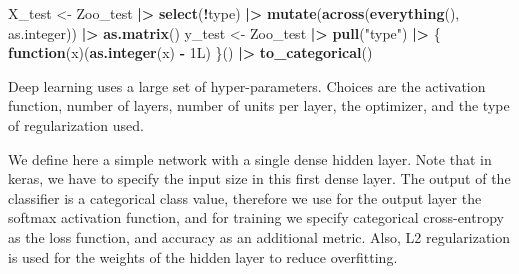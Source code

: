 \documentclass[
  notitlepage]{book}
\newenvironment{Shaded}{\begin{snugshade}}{\end{snugshade}}
\newcommand{\ControlFlowTok}[1]{\textcolor[rgb]{0.13,0.29,0.53}{\textbf{#1}}}
\newcommand{\ErrorTok}[1]{\textcolor[rgb]{0.64,0.00,0.00}{\textbf{#1}}}
\newcommand{\KeywordTok}[1]{\textcolor[rgb]{0.13,0.29,0.53}{\textbf{#1}}}
\newcommand{\NormalTok}[1]{#1}
\newcommand{\OperatorTok}[1]{\textcolor[rgb]{0.81,0.36,0.00}{\textbf{#1}}}
\newcommand{\StringTok}[1]{\textcolor[rgb]{0.31,0.60,0.02}{#1}}
\begin{document}
\begin{Shaded}
\begin{Highlighting}[]
\NormalTok{X\_test \textless{}{-}}\StringTok{ }\NormalTok{Zoo\_test }\OperatorTok{|}\ErrorTok{\textgreater{}}\StringTok{ }
\StringTok{  }\KeywordTok{select}\NormalTok{(}\OperatorTok{!}\NormalTok{type) }\OperatorTok{|}\ErrorTok{\textgreater{}}\StringTok{ }
\StringTok{  }\KeywordTok{mutate}\NormalTok{(}\KeywordTok{across}\NormalTok{(}\KeywordTok{everything}\NormalTok{(), as.integer)) }\OperatorTok{|}\ErrorTok{\textgreater{}}\StringTok{ }
\StringTok{  }\KeywordTok{as.matrix}\NormalTok{()}
\NormalTok{y\_test \textless{}{-}}\StringTok{ }\NormalTok{Zoo\_test }\OperatorTok{|}\ErrorTok{\textgreater{}}\StringTok{ }
\StringTok{  }\KeywordTok{pull}\NormalTok{(}\StringTok{"type"}\NormalTok{) }\OperatorTok{|}\ErrorTok{\textgreater{}}\StringTok{ }
\StringTok{  }\NormalTok{\{ }\ControlFlowTok{function}\NormalTok{(x)(}\KeywordTok{as.integer}\NormalTok{(x) }\OperatorTok{{-}}\StringTok{ }\NormalTok{1L) \}() }\OperatorTok{|}\ErrorTok{\textgreater{}}
\StringTok{  }\KeywordTok{to\_categorical}\NormalTok{()}
\end{Highlighting}
\end{Shaded}

Deep learning uses a large set of hyper-parameters. Choices are the
activation function, number of layers, number of units per layer, the
optimizer, and the type of regularization used.

We define here a simple network with a single dense hidden layer.
Note that in keras, we have to specify the input size in this first dense layer.
The output of the classifier is a categorical class value, therefore
we use for the output layer the softmax activation function, and for
training we specify
categorical cross-entropy as the loss function, and accuracy
as an additional metric.
Also, L2 regularization is used for the weights of the hidden layer to
reduce overfitting.
\end{document}
